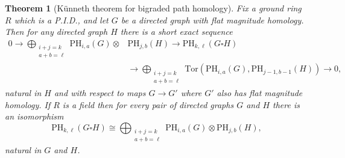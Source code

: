 \documentclass[a4paper, 11 pt, oneside, reqno]{amsart}
\numberwithin{lemma}{section}
\newtheorem{theorem}[lemma]{Theorem}
\theoremstyle{definition}
\newcommand{\PH}{\mathrm{PH}}
\begin{document}
\begin{theorem}[K\"unneth theorem for bigraded path homology]
\label{thm:kunneth_box_bigrad}
Fix a ground ring \(R\) which is a P.I.D., and let \(G\) be a directed graph with flat magnitude homology. Then for any directed graph \(H\) there is a short exact sequence
    \begin{equation}
    \label{eq:SES_PH}
    \begin{split}
    0 \to \bigoplus_{\substack{i+j=k \\a+b=\ell}}  \PH_{i,a}(G) \otimes &\PH_{j,b}(H) \to \PH_{k, \ell}(G \square H) \\
    & \to \bigoplus_{\substack{i+j=k \\a+b=\ell}} \mathrm{Tor}(\PH_{i,a}(G),\PH_{j-1,b-1}(H)) \to 0,
    \end{split}
    \end{equation}
natural in \(H\) and with respect to maps \(G \to G'\) where \(G'\) also has flat magnitude homology. If \(R\) is a field then for \emph{every} pair of directed graphs \(G\) and \(H\) there is an isomorphism
    \begin{equation}
    \label{eq:kunneth_iso_PH}
    \PH_{k, \ell}(G \square H) \cong \bigoplus_{\substack{i+j=k \\a+b=\ell}} \PH_{i,a}(G) \otimes \PH_{j,b}(H),
    \end{equation}
natural in \(G\) and \(H\).
\end{theorem}
\end{document}
